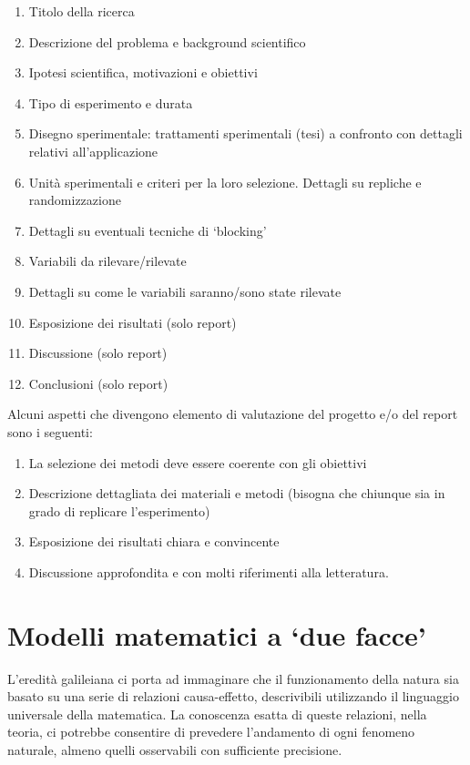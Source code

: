 \documentclass[a4paper,12pt,oneside]{book}
\providecommand{\tightlist}{%
  \setlength{\itemsep}{0pt}\setlength{\parskip}{0pt}}
\theoremstyle{definition}
\theoremstyle{definition}
\theoremstyle{definition}
\theoremstyle{remark}
\begin{document}
\begin{enumerate}
\def\labelenumi{\arabic{enumi}.}
\tightlist
\item
  Titolo della ricerca
\item
  Descrizione del problema e background scientifico
\item
  Ipotesi scientifica, motivazioni e obiettivi
\item
  Tipo di esperimento e durata
\item
  Disegno sperimentale: trattamenti sperimentali (tesi) a confronto con
  dettagli relativi all'applicazione
\item
  Unità sperimentali e criteri per la loro selezione. Dettagli su
  repliche e randomizzazione
\item
  Dettagli su eventuali tecniche di `blocking'
\item
  Variabili da rilevare/rilevate
\item
  Dettagli su come le variabili saranno/sono state rilevate
\item
  Esposizione dei risultati (solo report)
\item
  Discussione (solo report)
\item
  Conclusioni (solo report)
\end{enumerate}

Alcuni aspetti che divengono elemento di valutazione del progetto e/o
del report sono i seguenti:

\begin{enumerate}
\def\labelenumi{\arabic{enumi}.}
\tightlist
\item
  La selezione dei metodi deve essere coerente con gli obiettivi
\item
  Descrizione dettagliata dei materiali e metodi (bisogna che chiunque
  sia in grado di replicare l'esperimento)
\item
  Esposizione dei risultati chiara e convincente
\item
  Discussione approfondita e con molti riferimenti alla letteratura.
\end{enumerate}

\chapter{\texorpdfstring{Modelli matematici a `due
facce'}{Modelli matematici a due facce}}\label{modelli-matematici-a-due-facce}

L'eredità galileiana ci porta ad immaginare che il funzionamento della
natura sia basato su una serie di relazioni causa-effetto, descrivibili
utilizzando il linguaggio universale della matematica. La conoscenza
esatta di queste relazioni, nella teoria, ci potrebbe consentire di
prevedere l'andamento di ogni fenomeno naturale, almeno quelli
osservabili con sufficiente precisione.
\end{document}
